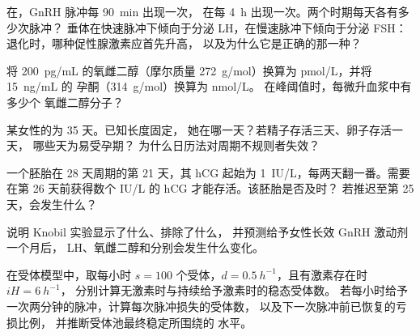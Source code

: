 \begin{exercise}[$\star\star$]\label{exo:b2:reproductive-hormones:5}
在，GnRH 脉冲每 \qty{90}{min} 出现一次，
在每 \qty{4}{h} 出现一次。两个时期每天各有多少次脉冲？
垂体在快速脉冲下倾向于分泌 LH，在慢速脉冲下倾向于分泌 FSH：
退化时，哪种促性腺激素应首先升高，
以及为什么它是正确的那一种？
\end{exercise}

\begin{exercise}[$\star\star$]\label{exo:b2:reproductive-hormones:6}
将 \qty{200}{pg/mL} 的氧雌二醇（摩尔质量
\qty{272}{g/mol}）换算为 \unit{pmol/L}，并将 \qty{15}{ng/mL} 的
孕酮（\qty{314}{g/mol}）换算为 \unit{nmol/L}。
在峰阈值时，每微升血浆中有多少个
氧雌二醇分子？
\end{exercise}

\begin{exercise}[$\star\star$]\label{exo:b2:reproductive-hormones:7}
某女性的为 35 天。已知长度固定，
她在哪一天？若精子存活三天、卵子存活一天，
哪些天为易受孕期？
为什么日历法对周期不规则者失效？
\end{exercise}

\begin{exercise}[$\star\star$]\label{exo:b2:reproductive-hormones:8}
一个胚胎在 28 天周期的第 21 天，其 hCG 起始为
\qty{1}{IU/L}，每两天翻一番。需要
在第 26 天前获得数个 IU/L 的 hCG 才能存活。该胚胎是否及时？
若推迟至第 25 天，会发生什么？
\end{exercise}

\begin{exercise}[$\star\star$]\label{exo:b2:reproductive-hormones:9}
说明 Knobil 实验显示了什么、排除了什么，
并预测给予女性长效 GnRH 激动剂一个月后，
LH、氧雌二醇和分别会发生什么变化。
\end{exercise}

\begin{exercise}[$\star\star\star$]\label{exo:b2:reproductive-hormones:10}
在受体模型中，取每小时 $s = 100$ 个受体，$d =
\qty{0.5}{h^{-1}}$，且有激素存在时 $iH = \qty{6}{h^{-1}}$，
分别计算无激素时与持续给予激素时的稳态受体数。
若每小时给予一次两分钟的脉冲，计算每次脉冲损失的受体数，
以及下一次脉冲前已恢复的亏损比例，
并推断受体池最终稳定所围绕的
水平。
\end{exercise}

